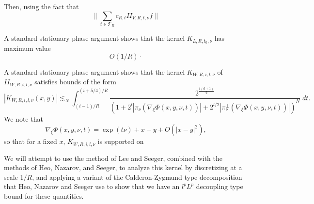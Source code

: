 Then, using the fact that
%
\[ \| \sum_{t \in \mathcal{T}_R} c_{R,t} II_{V,R,t,\nu} f \| \]

A standard stationary phase argument shows that the kernel $K_{L,R,t_0,\nu}$ has maximum value
%
\[ O(1/R) \cdot  \]

A standard stationary phase argument shows that the kernel $K_{W,R,i,l,\nu}$ of $II_{W,R,i,l,\nu}$ satisfies bounds of the form
%
\[ |K_{W,R,i,l,\nu}(x,y)| \lesssim_N \int_{(i-1)/R}^{(i+5/4)/R} \frac{2^{\frac{l(d+1)}{2}}}{(1 + 2^l | \pi_\nu( \nabla_\xi \Phi(x,y,\nu,t) ) | + 2^{l/2} | \pi_\nu^\perp ( \nabla_\xi \Phi(x,y,\nu,t) ) | )^N}\; dt. \]
%
We note that
%
\[ \nabla_\xi \Phi(x,y,\nu,t) = \exp(t \nu) + x - y + O(|x - y|^2), \]
%
so that for a fixed $x$, $K_{W,R,i,l,\nu}$ is supported on 




We will attempt to use the method of Lee and Seeger, combined with the methods of Heo, Nazarov, and Seeger, to analyze this kernel by discretizing at a scale $1/R$, and applying a variant of the Calderon-Zygmund type decomposition that Heo, Nazarov and Seeger use to show that we have an $l^p L^p$ decoupling type bound for these quantities.

